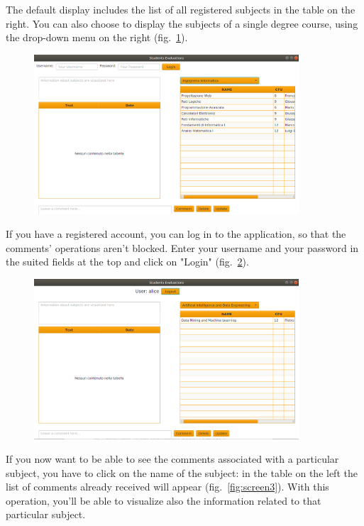 \documentclass[a4paper]{article}
\begin{document}
The default display includes the list of all registered subjects in the table on the right. You can also choose to display the subjects of a single degree course, using the drop-down menu on the right (fig.~\ref{fig:screen1}).

\begin{figure}[h]
\centering
\includegraphics[width=0.88\textwidth]{images/screens/screen1}
\label{fig:screen1}
\end{figure}
\clearpage

If you have a registered account, you can log in to the application, so that the comments' operations aren't blocked. Enter your username and your password in the suited fields at the top and click on "Login" (fig.~\ref{fig:screenLogin}).
\begin{figure}[h]
\centering
\includegraphics[width=0.88\textwidth]{images/screens/screenLogin}
\label{fig:screenLogin}
\end{figure}

If you now want to be able to see the comments associated with a particular subject, you have to click on the name of the subject: in the table on the left the list of comments already received will appear (fig.~\ref{fig:screen3}). With this operation, you'll be able to visualize also the information related to that particular subject.
\end{document}
